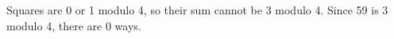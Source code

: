 Squares are 0 or 1 modulo 4, so their sum cannot be 3 modulo 4. Since 59 is 3 modulo 4, there are $\boxed0$ ways.
